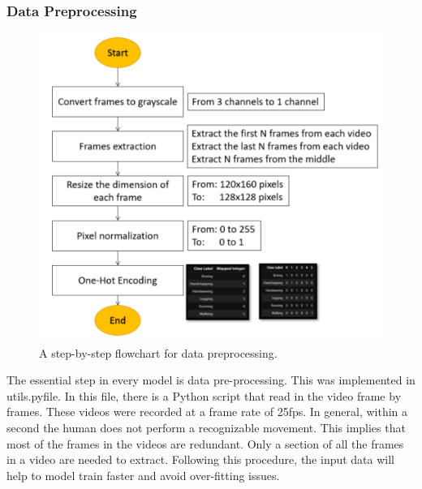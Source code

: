 \subsubsection{Data Preprocessing}
\begin{figure}[ht]
\centering
\includegraphics{Figures/dp}
\decoRule
\caption[A step-by-step flowchart for data preprocessing.]{A step-by-step flowchart for data preprocessing.}
\label{fig:la}
\end{figure}
The essential step in every model is data pre-processing. This was implemented in utils.pyfile. In this file, there is a Python script that read in the video frame by frames. These videos were recorded at a frame rate of 25fps. In general, within a second the human does not perform a recognizable movement. This implies that most of the frames in the videos are redundant. Only a section of all the frames in a video are needed to extract. Following this procedure, the input data will help to model train faster and avoid over-fitting issues.\\

